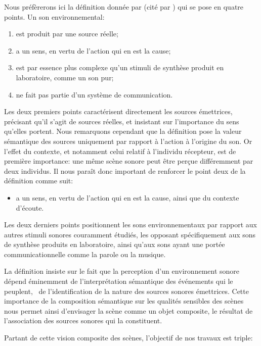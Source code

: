 Nous préfèrerons ici la définition donnée par \cite{vanderveer1980ecological} (cité par \cite{ballas1987interpreting}) qui se pose en quatre points. Un son environnemental:

\begin{enumerate}
\item est produit par une source réelle;
\item a un sens, en vertu de l'action qui en est la cause;
\item est par essence plus complexe qu'un stimuli de synthèse produit en laboratoire, comme un son pur;
\item ne fait pas partie d'un système de communication.
\end{enumerate}

Les deux premiers points caractérisent directement les sources émettrices, précisant qu'il s'agit de sources réelles, et insistant sur l'importance du sens qu'elles portent. Nous remarquons cependant que la définition pose la valeur sémantique des sources uniquement par rapport à l'action à l'origine du son. Or l'effet du contexte, et notamment celui relatif à l'individu récepteur, est de première importance: une même scène sonore peut être perçue différemment par deux individus. Il nous paraît donc important de renforcer le point deux de la définition comme suit:

\begin{itemize}
\setcounter{enumi}{2}
\item a un sens, en vertu de l'action qui en est la cause, ainsi que du contexte d'écoute.
\end{itemize}

Les deux derniers points positionnent les sons environnementaux par rapport aux autres stimuli sonores couramment étudiés, les opposant spécifiquement aux sons de synthèse produits en laboratoire, ainsi qu'aux sons ayant une portée communicationnelle comme la parole ou la musique.

La définition insiste sur le fait que la perception d'un environnement sonore dépend éminemment de l'interprétation sémantique des événements qui le peuplent, \ie~de l'identification de la nature des sources sonores émettrices. Cette importance de la composition sémantique sur les qualités sensibles des scènes nous permet ainsi d'envisager la scène comme un objet composite, le résultat de l'association des sources sonores qui la constituent.

Partant de cette vision composite des scènes, l'objectif de nos travaux est triple:

